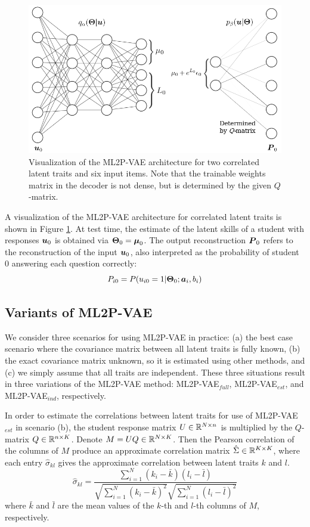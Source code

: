 \begin{figure}[h]
  \centering
  \includegraphics[width=.85\textwidth]{img/ml2pvae_visual.png}
  \caption{Visualization of the ML2P-VAE architecture for two correlated latent traits and six input items. Note that the trainable weights matrix in the decoder is not dense, but is determined by the given $Q$-matrix.}
  \label{fig:ml2pvae_visual}
\end{figure}

A visualization of the ML2P-VAE architecture for correlated latent traits is shown in Figure \ref{fig:ml2pvae_visual}. At test time, the estimate of the latent skills of a student with responses $\boldsymbol{u}_0$ is obtained via $\boldsymbol{\Theta}_0 = \boldsymbol{\mu}_0$. The output reconstruction $\boldsymbol{P}_0$ refers  to the reconstruction of the input $\boldsymbol{u}_0$, also interpreted as the probability of student $0$ answering each question correctly:
\[P_{i0} = P(u_{i0} = 1 | \boldsymbol{\Theta}_0; \boldsymbol{a}_i, b_i)\]



\subsection{Variants of ML2P-VAE}\label{sec:variants}

We consider three scenarios for using ML2P-VAE in practice: (a) the best case scenario where the covariance matrix between all latent traits is fully known, (b) the exact covariance matrix unknown, so it is estimated using other methods, and (c) we simply assume that all traits are independent. These three situations result in three variations of the ML2P-VAE method: ML2P-VAE$_{full}$, ML2P-VAE$_{est}$, and ML2P-VAE$_{ind}$, respectively. 

In order to estimate the correlations between latent traits for use of ML2P-VAE$_{est}$ in scenario (b), the student response matrix $U \in \mathbb{R}^{N\times n}$ is multiplied by the $Q$-matrix $Q \in \mathbb{R}^{n \times K}$. Denote $M = UQ \in \mathbb{R}^{N\times K}$. Then the Pearson correlation of the columns of $M$ produce an approximate correlation matrix $\hat \Sigma \in \mathbb{R}^{K \times K}$, where each entry $\hat \sigma_{kl}$ gives the approximate correlation between latent traits $k$ and $l$.
\begin{equation}
  \hat \sigma_{kl} = \frac{\sum_{i=1}^N (k_i - \bar k)(l_i - \bar l)}{\sqrt{\sum_{i=1}^N(k_i - \bar k)^2} \sqrt{\sum_{i=1}^N (l_i - \bar l)^2}}
  \label{eq:approx_cor_mat}
\end{equation}
where $\bar k$ and $\bar l$ are the mean values of the $k$-th and $l$-th columns of $M$, respectively.

